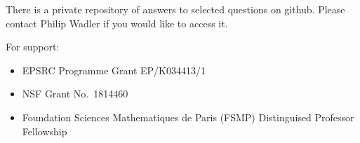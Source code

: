There is a private repository of answers to selected questions on
github. Please contact Philip Wadler if you would like to access it.

For support:

\begin{itemize}
\tightlist
\item
  EPSRC Programme Grant EP/K034413/1
\item
  NSF Grant No.~1814460
\item
  Foundation Sciences Mathematiques de Paris (FSMP) Distinguised
  Professor Fellowship
\end{itemize}

